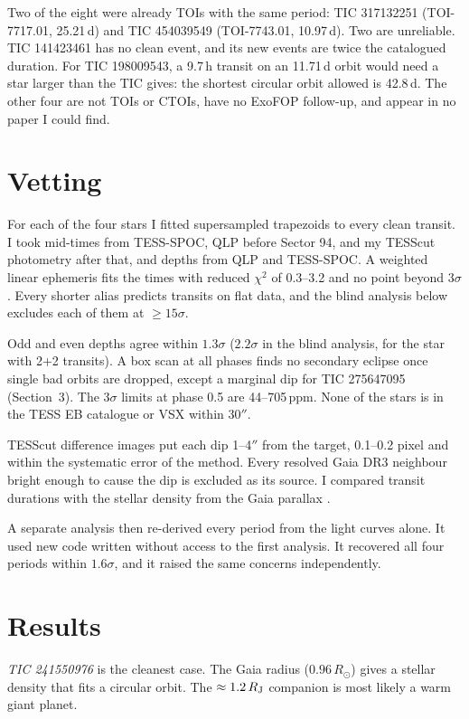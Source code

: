 \documentclass{aastex701}
\begin{document}
Two of the eight were already TOIs with the same period: TIC 317132251 (TOI-7717.01, 25.21\,d) and
TIC 454039549 (TOI-7743.01, 10.97\,d). Two are unreliable. TIC 141423461 has no clean event, and
its new events are twice the catalogued duration. For TIC 198009543, a 9.7\,h transit on an
11.71\,d orbit would need a star larger than the TIC gives: the shortest circular orbit allowed is
42.8\,d. The other four are not TOIs or CTOIs, have no ExoFOP follow-up, and appear in no paper I
could find.

\section{Vetting}

For each of the four stars I fitted supersampled trapezoids to every clean transit. I took
mid-times from TESS-SPOC, QLP before Sector 94, and my TESScut photometry after that, and depths
from QLP and TESS-SPOC. A weighted linear ephemeris fits the times with reduced $\chi^2$ of
0.3--3.2 and no point beyond $3\sigma$. Every shorter alias predicts transits on flat data, and the
blind analysis below excludes each of them at $\geq15\sigma$.

Odd and even depths agree within $1.3\sigma$ ($2.2\sigma$ in the blind analysis, for the star with
2+2 transits). A box scan at all phases finds no secondary eclipse
once single bad orbits are dropped, except a marginal dip for TIC 275647095 (Section~3). The $3\sigma$ limits at phase 0.5 are 44--705\,ppm.
None of the stars is in the TESS EB catalogue \citep{Prsa2022} or VSX \citep{Watson2006} within
$30''$.

TESScut difference images put each dip 1--4$''$ from the target, 0.1--0.2 pixel and within the
systematic error of the method. Every resolved Gaia DR3 \citep{Gaia2023} neighbour bright enough to
cause the dip is excluded as its source. I compared transit durations with the
stellar density from the Gaia parallax \citep{Seager2003}.

A separate analysis then re-derived every period from the light curves alone. It used new code
written without access to the first analysis. It recovered all four periods within $1.6\sigma$,
and it raised the same concerns independently.

\section{Results}

\textit{TIC 241550976} is the cleanest case. The Gaia radius ($0.96\,R_\odot$) gives a
stellar density that fits a circular orbit. The $\approx1.2\,R_{\rm J}$ companion is most likely a
warm giant planet.
\end{document}
